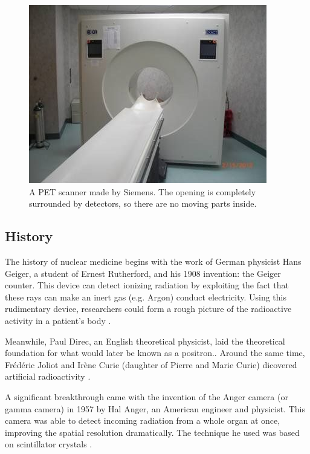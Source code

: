 \begin{figure}[ht]
\begin{center}
  \includegraphics[width=\linewidth]{img/petscanner.jpg}
  \caption{A PET scanner made by Siemens. The opening is completely surrounded
  by detectors, so there are no moving parts inside.}
  \label{fig:petscanner}
\end{center}
\end{figure}

\subsection{History}
The history of nuclear medicine begins with the work of German physicist Hans
Geiger, a student of Ernest Rutherford, and his 1908 invention: the Geiger
counter. This device can detect ionizing radiation by exploiting the fact that
these rays can make an inert gas (e.g. Argon) conduct electricity. Using
this rudimentary device, researchers could form a rough picture of the radioactive
activity in a patient's body \cite{specthistory, geigercountertube}.

Meanwhile, Paul Direc, an English theoretical physicist, laid the theoretical
foundation for what would later be known as a positron.\cite{positrontheory}.
Around the same time, Fr\'ed\'eric Joliot and Ir\`ene Curie (daughter of Pierre
and Marie Curie) dicovered artificial radioactivity \cite{artificialradio}.

A significant breakthrough came with the invention of the Anger camera (or
gamma camera) in 1957 by Hal Anger, an American engineer and physicist. This
camera was able to detect incoming radiation from a whole organ at once,
improving the spatial resolution dramatically. The technique he used was based
on scintillator crystals \cite{anger}.

